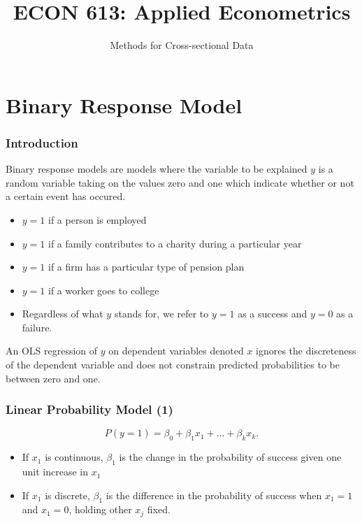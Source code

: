 \documentclass{beamer}
\newcommand{\1}{\mathbb{1}}
\begin{document}
\begin{frame}
\title{ECON 613: Applied Econometrics}
\subtitle{Methods for Cross-sectional Data}
\titlepage
\end{frame}

\section{Binary Response Model}

\begin{frame}
\tableofcontents[currentsection] 
\end{frame}


\begin{frame}\frametitle{Introduction}
Binary response models are models where the variable to be explained $y$ is a random variable taking on the values zero and one which indicate whether or not a certain event has occured. 
\begin{itemize}
\item $y=1$ if a person is employed
\item $y=1$ if a family contributes to a charity during a particular year
\item $y=1$ if a firm has a particular type of pension plan
\item $y=1$ if a worker goes to college
\item Regardless of what $y$ stands for, we refer to $y=1$ as a success and $y=0$ as a failure.
\end{itemize}
An OLS regression of $y$ on dependent variables denoted $x$ ignores the discreteness of the dependent variable and does not constrain predicted probabilities to be between zero and one. 
\end{frame}

\begin{frame}\frametitle{Linear Probability Model (1)}
\begin{equation}
P(y=1) = \beta_0 + \beta_1 x_1+ \ldots + \beta_k x_k. 
\end{equation}

\begin{itemize}
\item If $x_1$ is continuous, $\beta_1$ is the change in the probability of success given one unit increase in $x_1$
\item If $x_1$ is discrete, $\beta_1$ is the difference in the probability of success when $x_1 = 1$ and $x_1 = 0$, holding other $x_j$ fixed. 
\end{itemize}
\end{frame}
\end{document}
